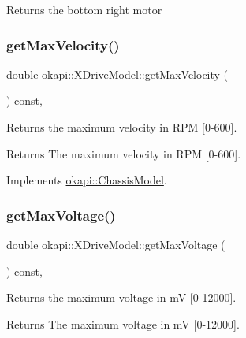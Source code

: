 \begin{DoxyReturn}{Returns}
the bottom right motor 
\end{DoxyReturn}
\mbox{\label{classokapi_1_1XDriveModel_aa5b5c3431c99c612ade5c97858478828}} 
\subsubsection{\texorpdfstring{getMaxVelocity()}{getMaxVelocity()}}
{\footnotesize\ttfamily double okapi\+::\+X\+Drive\+Model\+::get\+Max\+Velocity (\begin{DoxyParamCaption}{ }\end{DoxyParamCaption}) const\hspace{0.3cm}{\ttfamily [override]}, {\ttfamily [virtual]}}

Returns the maximum velocity in R\+PM \mbox{[}0-\/600\mbox{]}.

\begin{DoxyReturn}{Returns}
The maximum velocity in R\+PM \mbox{[}0-\/600\mbox{]}. 
\end{DoxyReturn}


Implements \mbox{\hyperlink{classokapi_1_1ChassisModel_ab45dd7430636ed1c1dee25dae6df5d46}{okapi\+::\+Chassis\+Model}}.

\mbox{\label{classokapi_1_1XDriveModel_a402487e35a717c47cfcc85ad1cfb0861}} 
\subsubsection{\texorpdfstring{getMaxVoltage()}{getMaxVoltage()}}
{\footnotesize\ttfamily double okapi\+::\+X\+Drive\+Model\+::get\+Max\+Voltage (\begin{DoxyParamCaption}{ }\end{DoxyParamCaption}) const\hspace{0.3cm}{\ttfamily [override]}, {\ttfamily [virtual]}}

Returns the maximum voltage in mV \mbox{[}0-\/12000\mbox{]}.

\begin{DoxyReturn}{Returns}
The maximum voltage in mV \mbox{[}0-\/12000\mbox{]}. 
\end{DoxyReturn}


